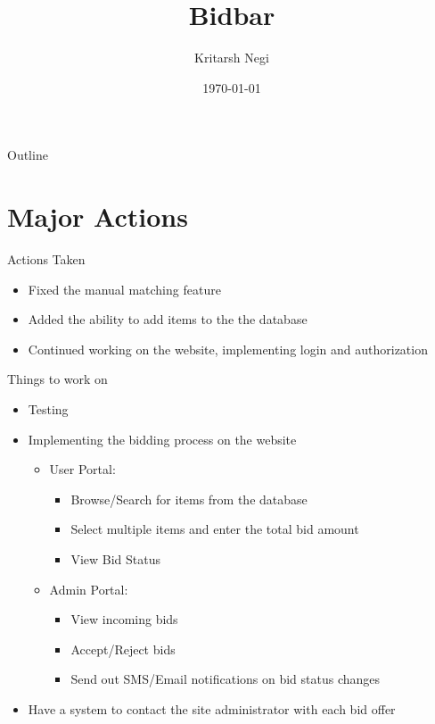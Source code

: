 \documentclass[aspectratio=1610]{beamer}
\title{Bidbar}
\author{Kritarsh Negi}
\institute{The CPAP Box}
\date{\today}
\begin{document}
\begin{frame}
    \titlepage
\end{frame}

\begin{frame}{Outline}
    \tableofcontents
\end{frame}

\section{Major Actions}
\begin{frame}{Actions Taken}
    \begin{itemize}
        \item Fixed the manual matching feature
        \item Added the ability to add items to the the database
        \item Continued working on the website, implementing login and authorization
    \end{itemize}
\end{frame}
\begin{frame}{Things to work on }
    \begin{itemize}
        \item Testing
        \item Implementing the bidding process on the website
        \begin{itemize}
            \item User Portal:
            \begin{itemize}
                \item Browse/Search for items from the database
                \item Select multiple items and enter the total bid amount
                \item View Bid Status
            \end{itemize}
            \item Admin Portal:
            \begin{itemize}
                \item View incoming bids
                \item Accept/Reject bids
                \item Send out SMS/Email notifications on bid status changes
            \end{itemize}
        \end{itemize}
        \item Have a system to contact the site administrator with each bid offer
    \end{itemize}
\end{frame}
\end{document}
